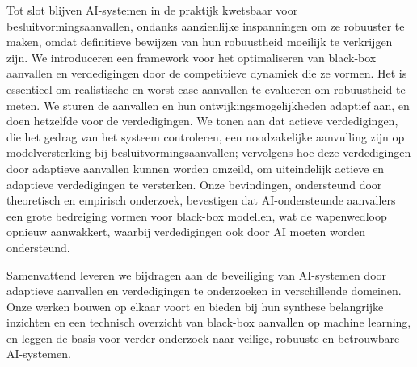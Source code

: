 Tot slot blijven AI-systemen in de praktijk kwetsbaar voor besluitvormingsaanvallen, ondanks aanzienlijke inspanningen om ze robuuster te maken, omdat definitieve bewijzen van hun robuustheid moeilijk te verkrijgen zijn. We introduceren een framework voor het optimaliseren van black-box aanvallen en verdedigingen door de competitieve dynamiek die ze vormen. Het is essentieel om realistische en worst-case aanvallen te evalueren om robuustheid te meten. We sturen de aanvallen en hun ontwijkingsmogelijkheden adaptief aan, en doen hetzelfde voor de verdedigingen. We tonen aan dat actieve verdedigingen, die het gedrag van het systeem controleren, een noodzakelijke aanvulling zijn op modelversterking bij besluitvormingsaanvallen; vervolgens hoe deze verdedigingen door adaptieve aanvallen kunnen worden omzeild, om uiteindelijk actieve en adaptieve verdedigingen te versterken. Onze bevindingen, ondersteund door theoretisch en empirisch onderzoek, bevestigen dat AI-ondersteunde aanvallers een grote bedreiging vormen voor black-box modellen, wat de wapenwedloop opnieuw aanwakkert, waarbij verdedigingen ook door AI moeten worden ondersteund.

Samenvattend leveren we bijdragen aan de beveiliging van AI-systemen door adaptieve aanvallen en verdedigingen te onderzoeken in verschillende domeinen. Onze werken bouwen op elkaar voort en bieden bij hun synthese belangrijke inzichten en een technisch overzicht van black-box aanvallen op machine learning, en leggen de basis voor verder onderzoek naar veilige, robuuste en betrouwbare AI-systemen.

\instructionsabstract

\cleardoublepage

